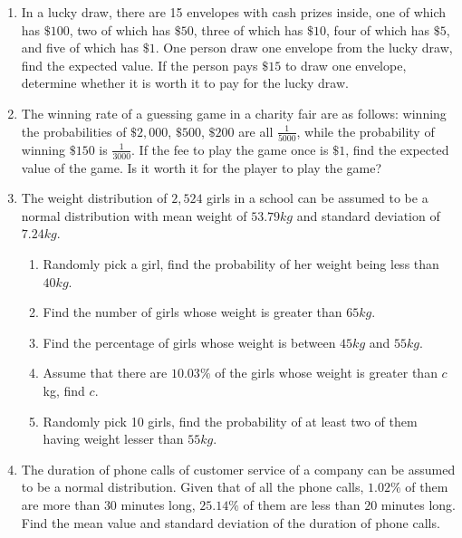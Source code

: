 \documentclass{report}
\begin{document}
\begin{multicols}{2}
\begin{enumerate}
    \item In a lucky draw, there are 15 envelopes with cash prizes inside, one of which
          has $\$100$, two of which has $\$50$, three of which has $\$10$, four of which
          has $\$5$, and five of which has $\$1$. One person draw one envelope from the
          lucky draw, find the expected value. If the person pays $\$15$ to draw one
          envelope, determine whether it is worth it to pay for the lucky draw.

    \item The winning rate of a guessing game in a charity fair are as follows: winning
          the probabilities of $\$2,000$, $\$500$, $\$200$ are all $\frac{1}{5000}$,
          while the probability of winning $\$150$ is $\frac{1}{3000}$. If the fee to
          play the game once is $\$1$, find the expected value of the game. Is it worth
          it for the player to play the game?

    \item The weight distribution of $2,524$ girls in a school can be assumed to be a
          normal distribution with mean weight of $53.79kg$ and standard deviation of
          $7.24kg$.
          \begin{enumerate}
            \item Randomly pick a girl, find the probability of her weight being less than
                  $40kg$.
            \item Find the number of girls whose weight is greater than $65kg$.
            \item Find the percentage of girls whose weight is between $45kg$ and $55kg$.
            \item Assume that there are $10.03\%$ of the girls whose weight is greater than
                  $c$kg, find $c$.
            \item Randomly pick 10 girls, find the probability of at least two of them having
                  weight lesser than $55kg$.
          \end{enumerate}

    \item The duration of phone calls of customer service of a company can be assumed to
          be a normal distribution. Given that of all the phone calls, $1.02\%$ of them
          are more than $30$ minutes long, $25.14\%$ of them are less than $20$ minutes
          long. Find the mean value and standard deviation of the duration of phone
          calls.
  \end{enumerate}

\end{multicols}
\end{document}
